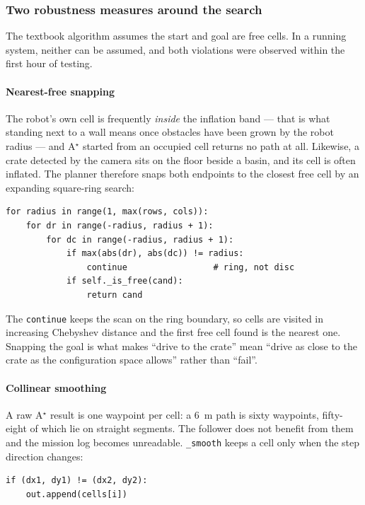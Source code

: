 \subsubsection{Two robustness measures around the search}

The textbook algorithm assumes the start and goal are free cells. In a
running system, neither can be assumed, and both violations were
observed within the first hour of testing.

\paragraph{Nearest-free snapping}
The robot's own cell is frequently \emph{inside} the inflation band ---
that is what standing next to a wall means once obstacles have been
grown by the robot radius --- and A$^\star$ started from an occupied
cell returns no path at all. Likewise, a crate detected by the camera
sits on the floor beside a basin, and its cell is often inflated. The
planner therefore snaps both endpoints to the closest free cell by an
expanding square-ring search:

\begin{lstlisting}[style=python]
for radius in range(1, max(rows, cols)):
    for dr in range(-radius, radius + 1):
        for dc in range(-radius, radius + 1):
            if max(abs(dr), abs(dc)) != radius:
                continue                 # ring, not disc
            if self._is_free(cand):
                return cand
\end{lstlisting}

The \texttt{continue} keeps the scan on the ring boundary, so cells are
visited in increasing Chebyshev distance and the first free cell found is
the nearest one. Snapping the goal is what makes ``drive to the crate''
mean ``drive as close to the crate as the configuration space allows''
rather than ``fail''.

\paragraph{Collinear smoothing}
A raw A$^\star$ result is one waypoint per cell: a \SI{6}{m} path is
sixty waypoints, fifty-eight of which lie on straight segments. The
follower does not benefit from them and the mission log becomes
unreadable. \texttt{\_smooth} keeps a cell only when the step direction
changes:

\begin{lstlisting}[style=python]
if (dx1, dy1) != (dx2, dy2):
    out.append(cells[i])
\end{lstlisting}

